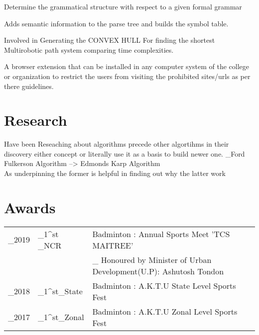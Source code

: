 \documentclass[]{deedy-resume-openfont}
\begin{document}
\begin{minipage}[t]{0.66\textwidth}
\begin{tightemize}
\item Determine the grammatical structure with respect to a given formal grammar
\item Adds semantic information to the parse tree and builds the symbol table.
\end{tightemize}
\sectionsep
{}
\begin{tightemize}
\item Involved in Generating the CONVEX HULL For finding the shortest Multirobotic path system comparing time complexities.\\
\end{tightemize}
\sectionsep
{}
\begin{tightemize}
\item A browser extension that can be installed in any computer system of the college or organization to restrict the users from visiting the prohibited sites/urls as per there guidelines.

\end{tightemize}
\sectionsep


\section{Research}
\item Have been Reseaching about algorithms precede other algortihms in their discovery either concept or literally use it as a basis to build newer one.
_{Ford Fulkerson Algorithm --> Edmonds Karp Algorithm}\\
As underpinning the former is helpful in finding out why the latter work
\sectionsep


\section{Awards} 
\begin{tabular}{r l l}
_{2019} & _{1}^{st} _{NCR} & Badminton : Annual Sports Meet 'TCS MAITREE' \\
&  & _{\footnotesize{ Honoured by Minister of Urban Development(U.P): Ashutosh Tondon}}\\
_{2018} & _{1}^{st}_{State} & Badminton : A.K.T.U State Level Sports Fest \\

_{2017} & _{1}^{st}_{Zonal} & Badminton : A.K.T.U Zonal Level Sports Fest \\
\end{tabular}
\sectionsep




\end{minipage} 
\end{document}
